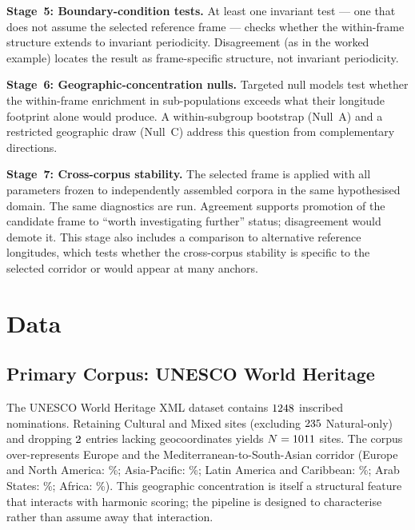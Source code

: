 \documentclass[12pt,a4paper]{article}
\begin{document}
\textbf{Stage~5: Boundary-condition tests.} At least one invariant test
— one that does not assume the selected reference frame — checks whether
the within-frame structure extends to invariant periodicity.
Disagreement (as in the worked example) locates the result as
frame-specific structure, not invariant periodicity.

\textbf{Stage~6: Geographic-concentration nulls.} Targeted null models
test whether the within-frame enrichment in sub-populations exceeds what
their longitude footprint alone would produce. A within-subgroup bootstrap
(Null~A) and a restricted geographic draw (Null~C) address this
question from complementary directions.

\textbf{Stage~7: Cross-corpus stability.} The selected frame is applied
with all parameters frozen to independently assembled corpora in the
same hypothesised domain. The same diagnostics are run. Agreement
supports promotion of the candidate frame to ``worth investigating
further'' status; disagreement would demote it. This stage also
includes a comparison to alternative reference longitudes, which tests
whether the cross-corpus stability is specific to the selected corridor
or would appear at many anchors.

\section{Data}
\label{sec:data}

\subsection{Primary Corpus: UNESCO World Heritage}

The UNESCO World Heritage XML dataset \citep{unescowhc2024xml} contains
$1248$ inscribed nominations. Retaining Cultural and Mixed sites
(excluding $235$ Natural-only) and dropping $2$
entries lacking geocoordinates yields $N = 1011$ sites. The
corpus over-represents Europe and the Mediterranean-to-South-Asian
corridor (Europe and North America: \CorpusPctEurope\%; Asia-Pacific:
\CorpusPctAsiaPac\%; Latin America and Caribbean: \CorpusPctLatAm\%;
Arab States: \CorpusPctArabStates\%; Africa: \CorpusPctAfrica\%). This
geographic concentration is itself a structural feature that interacts
with harmonic scoring; the pipeline is designed to characterise rather
than assume away that interaction.
\end{document}
